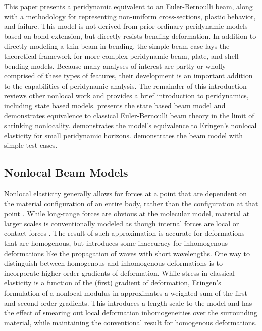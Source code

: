 \documentclass[5p,twocolumn]{elsarticle}
\begin{document}
This paper presents a peridynamic equivalent to an Euler-Bernoulli beam, along with a methodology for representing non-uniform cross-sections, plastic behavior, and failure.  
This model is not derived from prior ordinary peridynamic models based on bond extension, but directly resists bending deformation.
In addition to directly modeling a thin beam in bending, the simple beam case lays the theoretical framework for more complex peridynamic beam, plate, and shell bending models.
Because many analyses of interest are partly or wholly comprised of these types of features, their development is an important addition to the capabilities of peridynamic analysis.
%
The remainder of this introduction reviews other nonlocal work and provides a brief introduction to peridynamics, including state based models.
 presents the state based beam model and demonstrates equivalence to classical Euler-Bernoulli beam theory in the limit of shrinking nonlocality.
 demonstrates the model's equivalence to Eringen's nonlocal elasticity for small peridynamic horizons.
 demonstrates the beam model with simple test cases.
%
\subsection{Nonlocal Beam Models}
\label{sec:NLbeams}
%
Nonlocal elasticity generally allows for forces at a point that are dependent on the material configuration of an entire body, rather than the configuration at that point \cite{eringen1972nonlocal}.  While long-range forces are obvious at the molecular model, material at larger scales is conventionally modeled as though internal forces are local or contact forces \cite{kroner1967elasticity}.
The result of such approximation is accurate for deformations that are homogenous, but introduces some inaccuracy for inhomogenous deformations like the propagation of waves with short wavelengths.
One way to distinguish between homogenous and inhomogenous deformations is to incorporate higher-order gradients of deformation.
While stress in classical elasticity is a function of the (first) gradient of deformation, Eringen's formulation of a nonlocal modulus in \cite{eringen1983differential} approximates a weighted sum of the first and second order gradients.
This introduces a length scale to the model and has the effect of smearing out local deformation inhomogeneities over the surrounding material, while maintaining the conventional result for homogenous deformations.
\end{document}
